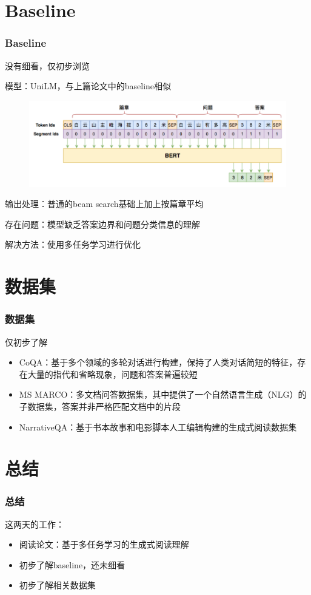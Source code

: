 \documentclass{beamer}
\begin{document}
\section{Baseline}
\begin{frame}
    \frametitle{Baseline}

    没有细看，仅初步浏览

    模型：UniLM，与上篇论文中的baseline相似

    \begin{figure}
        \centering
        \includegraphics[scale=0.4]{./fig/baseline.png}
    \end{figure}

    输出处理：普通的beam search基础上加上按篇章平均

    存在问题：模型缺乏答案边界和问题分类信息的理解

    解决方法：使用多任务学习进行优化

\end{frame}

\section{数据集}
\begin{frame}
    \frametitle{数据集}

    仅初步了解

    \begin{itemize}
        \item CoQA：基于多个领域的多轮对话进行构建，保持了人类对话简短的特征，存在大量的指代和省略现象，问题和答案普遍较短
        \item MS MARCO：多文档问答数据集，其中提供了一个自然语言生成（NLG）的子数据集，答案并非严格匹配文档中的片段
        \item NarrativeQA：基于书本故事和电影脚本人工编辑构建的生成式阅读数据集
    \end{itemize}

\end{frame}

\section{总结}
\begin{frame}
    \frametitle{总结}

    这两天的工作：

    \begin{itemize}
        \item 阅读论文：基于多任务学习的生成式阅读理解
        \item 初步了解baseline，还未细看
        \item 初步了解相关数据集
    \end{itemize}

\end{frame}
\end{document}
